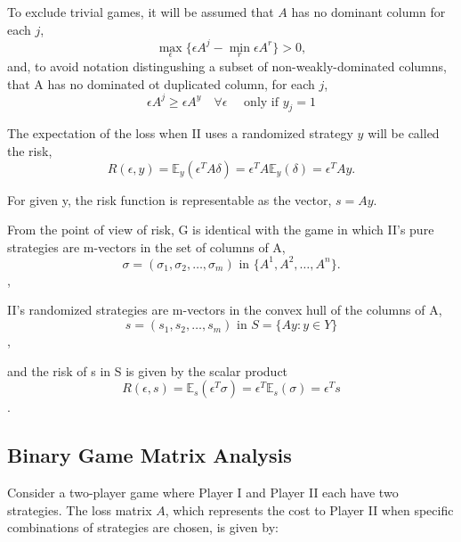 \documentclass[11pt]{article}
\theoremstyle{boldStyle}
\begin{document}
To exclude trivial games, it will be assumed that $A$ has no dominant column for each $j$,
\begin{equation} \label{eq:4}
    \max_{\epsilon} \{ \epsilon A^j - \min_{r} \epsilon A^r \} > 0,
\end{equation}
and, to avoid notation distingushing a subset of non-weakly-dominated columns, that A has no dominated ot duplicated column, for each $j$,
\begin{equation} \label{eq:5}
    \epsilon A^j \geq \epsilon A^y \quad \forall \epsilon \quad \text{ only if } y_j = 1
\end{equation}

\bigbreak

The expectation of the loss when II uses a randomized strategy \( y \) will be called the risk,
\[
    R(\epsilon, y) = \mathbb{E}_y(\epsilon^T A \delta) = \epsilon^T A \mathbb{E}_y(\delta) = \epsilon^T A y.
\]

For given y, the risk function is representable as the vector, $s = Ay$.

From the point of view of risk, G is identical with the game in which II's pure strategies are m-vectors in the set of columns of A, 
\begin{equation} \label{eq:6}
    \sigma = (\sigma_1, \sigma_2, \ldots, \sigma_m) \text{ in } \{A^1, A^2, \ldots, A^n\}.
\end{equation},

II's randomized strategies are m-vectors in the convex hull of the columns of A, 
\begin{equation} \label{eq:7}
    s = (s_1, s_2, \ldots, s_m) \text{ in } S = \{Ay : y \in Y \}
\end{equation},

and the risk of s in S is given by the scalar product
\begin{equation} \label{eq:8}
    R(\epsilon, s) = \mathbb{E}_s(\epsilon^T \sigma) = \epsilon^T \mathbb{E}_s(\sigma) = \epsilon^T s
\end{equation}.



\subsection{Binary Game Matrix Analysis}

Consider a two-player game where Player I and Player II each have two strategies. The loss matrix \( A \), which represents the cost to Player II when specific combinations of strategies are chosen, is given by:
\end{document}
